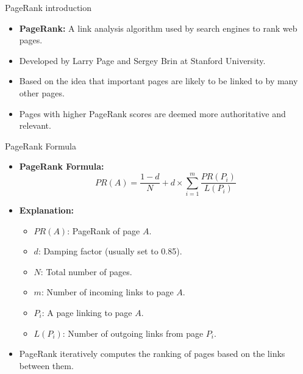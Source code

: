 \documentclass{beamer}
\begin{document}
\begin{frame}{PageRank introduction}
    \begin{itemize}
        \item \textbf{PageRank:} A link analysis algorithm used by search engines to rank web pages.
        \item Developed by Larry Page and Sergey Brin at Stanford University.
        \item Based on the idea that important pages are likely to be linked to by many other pages.
        \item Pages with higher PageRank scores are deemed more authoritative and relevant.
    \end{itemize}
\end{frame}

\begin{frame}{PageRank Formula}
    \begin{itemize}
        \item \textbf{PageRank Formula:}
        \[
        PR(A) = \frac{1 - d}{N} + d \times \sum_{i=1}^{m} \frac{PR(P_i)}{L(P_i)}
        \]
        \item \textbf{Explanation:}
        \begin{itemize}
            \item \(PR(A)\): PageRank of page \(A\).
            \item \(d\): Damping factor (usually set to 0.85).
            \item \(N\): Total number of pages.
            \item \(m\): Number of incoming links to page \(A\).
            \item \(P_i\): A page linking to page \(A\).
            \item \(L(P_i)\): Number of outgoing links from page \(P_i\).
        \end{itemize}
        \item PageRank iteratively computes the ranking of pages based on the links between them.
    \end{itemize}
\end{frame}
\end{document}
